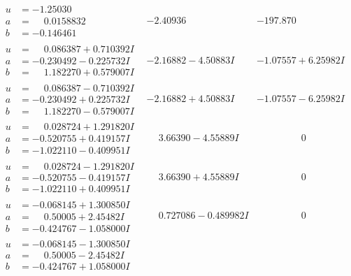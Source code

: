 \documentclass[1p]{elsarticle_modified}
\theoremstyle{definition}
\begin{document}
$$\begin{array}{c|c|c}
\begin{aligned}
u &= -1.25030\phantom{ +0.000000I} \\
a &= \phantom{-}0.0158832\phantom{ +0.000000I} \\
b &= -0.146461\phantom{ +0.000000I}\end{aligned}
 & -2.40936\phantom{ +0.000000I} & -197.870\phantom{ +0.000000I} \\ \hline\begin{aligned}
u &= \phantom{-}0.086387 + 0.710392 I \\
a &= -0.230492 - 0.225732 I \\
b &= \phantom{-}1.182270 + 0.579007 I\end{aligned}
 & -2.16882 - 4.50883 I & -1.07557 + 6.25982 I \\ \hline\begin{aligned}
u &= \phantom{-}0.086387 - 0.710392 I \\
a &= -0.230492 + 0.225732 I \\
b &= \phantom{-}1.182270 - 0.579007 I\end{aligned}
 & -2.16882 + 4.50883 I & -1.07557 - 6.25982 I \\ \hline\begin{aligned}
u &= \phantom{-}0.028724 + 1.291820 I \\
a &= -0.520755 + 0.419157 I \\
b &= -1.022110 - 0.409951 I\end{aligned}
 & \phantom{-}3.66390 - 4.55889 I & \phantom{-0.000000 } 0 \\ \hline\begin{aligned}
u &= \phantom{-}0.028724 - 1.291820 I \\
a &= -0.520755 - 0.419157 I \\
b &= -1.022110 + 0.409951 I\end{aligned}
 & \phantom{-}3.66390 + 4.55889 I & \phantom{-0.000000 } 0 \\ \hline\begin{aligned}
u &= -0.068145 + 1.300850 I \\
a &= \phantom{-}0.50005 + 2.45482 I \\
b &= -0.424767 - 1.058000 I\end{aligned}
 & \phantom{-}0.727086 - 0.489982 I & \phantom{-0.000000 } 0 \\ \hline\begin{aligned}
u &= -0.068145 - 1.300850 I \\
a &= \phantom{-}0.50005 - 2.45482 I \\
b &= -0.424767 + 1.058000 I\end{aligned}

\end{array}$$
\end{document}
